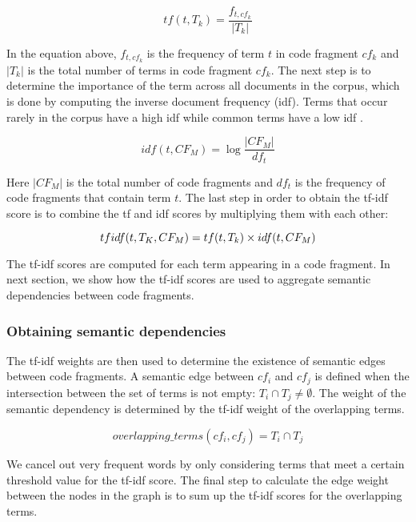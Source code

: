 \begin{equation}
    tf(t,T_k) = \frac{f_{t,cf_k}}{|T_k|} 
\end{equation}

\noindent
In the equation above, $f_{t,cf_k}$ is the frequency of term $t$ in code fragment $cf_k$ and $|T_k|$ is the total number of terms in code fragment $cf_k$.  
The next step is to determine the importance of the term across all documents in the corpus, which is done by computing the inverse document frequency (idf). Terms that occur rarely in the corpus have a high idf while common terms have a low idf \cite{ramos2003using}. 

\begin{equation}
    idf(t,CF_M) = \log{\frac{|CF_M|}{df_{t}}}
\end{equation}

\noindent
Here $|CF_M|$ is the total number of code fragments and $df_t$ is the frequency of code fragments that contain term $t$. The last step in order to obtain the tf-idf score is to combine the tf and idf scores by multiplying them with each other:

\begin{equation}
    tf\-idf(t,T_K,CF_M) = tf(t,T_k) \times idf(t,CF_M)
\end{equation}

The tf-idf scores are computed for each term appearing in a code fragment. In next section, we show how the tf-idf scores are used to aggregate semantic dependencies between code fragments.

\subsubsection{Obtaining semantic dependencies}
The tf-idf weights are then used to determine the existence of semantic edges between code fragments. A semantic edge between $cf_i$ and $cf_j$ is defined when  the intersection between the set of terms is not empty: $T_i \cap T_j \neq \emptyset$. The weight of the semantic dependency is determined by the tf-idf weight of the overlapping terms.

\begin{equation}
    overlapping\_terms(cf_i, cf_j) = T_i \cap T_j
\end{equation}

We cancel out very frequent words by only considering terms that meet a certain threshold value for the tf-idf score. The final step to calculate the edge weight between the nodes in the graph is to sum up the tf-idf scores for the overlapping terms. 

